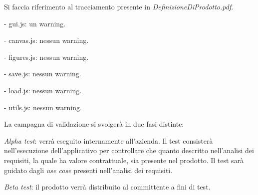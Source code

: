 Si faccia riferimento al tracciamento presente in \textit{DefinizioneDiProdotto.pdf}.

\begin{elencopuntato}[\subsubsecindent]
\item[-] gui.js: un warning.
\item[-] canvas.js: nessun warning.
\item[-] figures.js: nessun warning.
\item[-] save.js: nessun warning.
\item[-] load.js: nessun warning.
\item[-] utils.js: nessun warning.
\end{elencopuntato}


 
 
 
La campagna di validazione si svolger\`a in due fasi distinte:
\begin{elenconumerato}[\textbf{}]{\subsubsecindent}
\item \textit{Alpha test}: verr\`a eseguito internamente all'azienda. Il test consister\`a nell'esecuzione dell'applicativo per controllare che quanto descritto nell'analisi dei requisiti, la quale ha valore contrattuale, sia presente nel prodotto. Il test sar\`a guidato dagli \textit{use case} presenti nell'analisi dei requisiti.
\item \textit{Beta test}: il prodotto verr\`a distribuito al committente a fini di test.
\end{elenconumerato}
 

 
